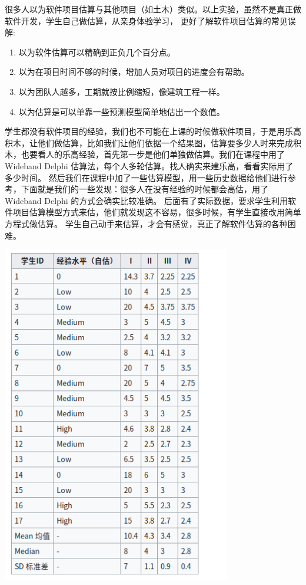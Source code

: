 很多人以为软件项目估算与其他项目（如土木）类似。以上实验，虽然不是真正做软件开发，学生自己做估算，从亲身体验学习，
更好了解软件项目估算的常见误解:

\begin{enumerate}
\tightlist
\item
  以为软件估算可以精确到正负几个百分点。
\item
  以为在项目时间不够的时候，增加人员对项目的进度会有帮助。
\item
  以为团队人越多，工期就按比例缩短，像建筑工程一样。
\item
  以为估算是可以单靠一些预测模型简单地估出一个数值。
\end{enumerate}

学生都没有软件项目的经验，我们也不可能在上课的时候做软件项目，于是用乐高积木，让他们做估算，比如我们让他们依据一个结果图，估算要多少人时来完成积木，也要看人的乐高经验，首先第一步是他们单独做估算。我们在课程中用了Wideband
Delphi 估算法，每个人多轮估算。找人确实来建乐高，看看实际用了多少时间。
然后我们在课程中加了一些估算模型，用一些历史数据给他们进行参考，下面就是我们的一些发现：很多人在没有经验的时候都会高估，用了Wideband
Delphi 的方式会确实比较准确。
后面有了实际数据，要求学生利用软件项目估算模型方式来估，他们就发现这不容易，很多时候，有学生直接改用简单方程式做估算。
学生自己动手来估算，才会有感觉，真正了解软件估算的各种困难。


\includegraphics[width=10cm]{Screenshotfrom2023-11-1221-58-52.png}

